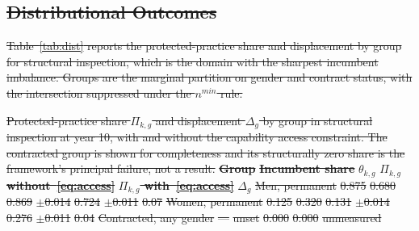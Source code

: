 \documentclass[utf8]{FrontiersinHarvard}
\providecommand{\DIFdel}[1]{{\protect\color{red}\sout{#1}}}                      %
\providecommand{\DIFdelbegin}{} %
\providecommand{\DIFdelFL}[1]{\DIFdel{#1}} %
\begin{document}
	\DIFdelbegin %

\subsection{\DIFdel{Distributional Outcomes}}
\addtocounter{subsection}{-1}%

\DIFdel{Table~\ref{tab:dist} reports the protected-practice share and displacement by group for structural inspection, which is the domain with the sharpest incumbent imbalance. Groups are the marginal partition on gender and contract status, with the intersection suppressed under the $n^{min}$ rule.
	}%

{%
\DIFdelFL{Protected-practice share $\Pi_{k,g}$ and displacement $\Delta_g$ by group in structural inspection at year 10, with and without the capability access constraint. The contracted group is shown for completeness and its structurally zero share is the framework's principal failure, not a result.}}
\textbf{\DIFdelFL{Group}} %
\textbf{\DIFdelFL{Incumbent share}} %
\textbf{\DIFdelFL{$\theta_{k,g}$}} %
\textbf{\DIFdelFL{$\Pi_{k,g}$ without~\eqref{eq:access}}} %
\textbf{\DIFdelFL{$\Pi_{k,g}$ with~\eqref{eq:access}}} %
\textbf{\DIFdelFL{$\Delta_g$}}%
\DIFdelFL{Men, permanent }%
\DIFdelFL{0.875 }%
\DIFdelFL{0.680 }%
\DIFdelFL{0.869 }%
\DIFdelFL{$\pm$0.014}%
\DIFdelFL{0.724 }%
\DIFdelFL{$\pm$0.011}%
\DIFdelFL{0.07}%
\DIFdelFL{Women, permanent }%
\DIFdelFL{0.125 }%
\DIFdelFL{0.320 }%
\DIFdelFL{0.131 }%
\DIFdelFL{$\pm$0.014}%
\DIFdelFL{0.276 }%
\DIFdelFL{$\pm$0.011}%
\DIFdelFL{0.04}%
\DIFdelFL{Contracted, any gender }%
\DIFdelFL{--- }%
\DIFdelFL{unset }%
\DIFdelFL{0.000 }%
\DIFdelFL{0.000 }%
\DIFdelFL{unmeasured}%
\end{document}
